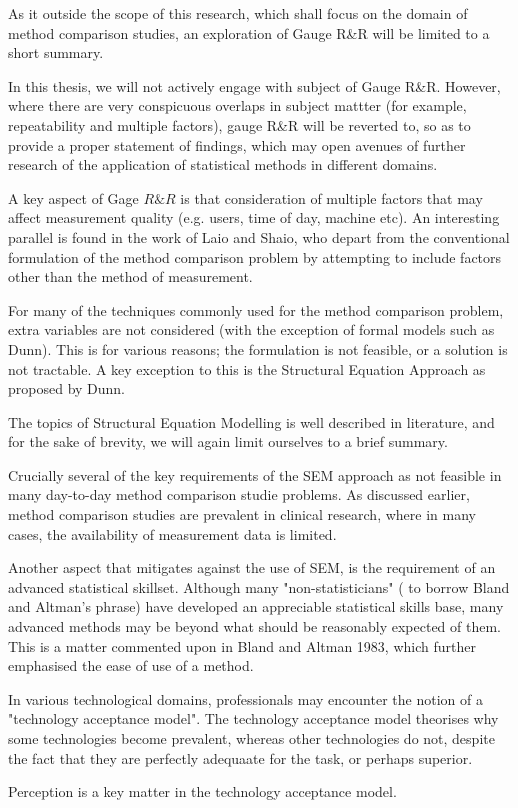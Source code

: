 
As it outside the scope of this research, which shall focus on the domain of method comparison studies, an exploration of Gauge R\&R will be limited to a short summary.

In this thesis, we will not actively engage with subject of Gauge R\&R. However, where there are very conspicuous overlaps in subject mattter (for example, repeatability and multiple factors), gauge R\&R 
will be reverted to, so as to provide a proper statement of findings, which may open avenues of further research of the application of statistical methods in different domains.

A key aspect of Gage $R\&R$ is that consideration of multiple factors that may affect measurement quality (e.g. users, time of day, machine etc). An interesting parallel is found in the work of Laio and Shaio, who depart from the conventional formulation of the method comparison problem by attempting to include factors other than the method of measurement.

For many of the techniques commonly used for the method comparison problem, extra variables are not considered (with the exception of formal models such as Dunn). This is for various reasons; the formulation is not feasible, or a solution is not tractable.  A key exception to this is the Structural Equation Approach as proposed by Dunn.

The topics of Structural Equation Modelling is well described in literature, and for the sake of brevity, we will again limit ourselves to a brief summary.

Crucially several of the key requirements of the SEM approach as not feasible in many day-to-day method comparison studie problems. As discussed earlier, method comparison studies are prevalent in clinical research, where in many cases, the availability of measurement data is limited.

Another aspect that mitigates against the use of SEM, is the requirement of an advanced statistical skillset. Although many "non-statisticians" ( to borrow Bland and Altman's phrase) have developed an appreciable 
statistical skills base, many advanced methods may be beyond what should be reasonably expected of them. This is a matter commented upon in Bland and Altman 1983, which further emphasised the ease of use of a method.

In various technological domains, professionals may encounter the notion of a "technology acceptance model". The technology acceptance model theorises why some technologies become prevalent, whereas other technologies do not, despite the fact that they are perfectly adequaate for the task, or perhaps superior.

Perception is a key matter in the technology acceptance model.

